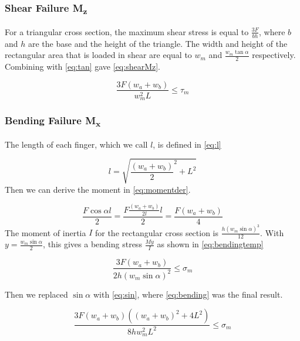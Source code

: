 \subsubsection{Shear Failure M\textsubscript{z}}
For a triangular cross section, the maximum shear stress is equal to $\frac{3F}{bh}$, where $b$ and $h$ are the base and the height of the triangle. 
The width and height of the rectangular area that is loaded in shear are equal to $w_m$ and $\frac{w_m \tan \alpha}{2} $ respectively. 
Combining with \cref{eq:tan} gave \cref{eq:shearMz}.

\begin{equation}
	\label{eq:shearMz}
	\frac{ 3 F \left(w_a + w_b \right) }{ w_m ^2 L} \le \tau_m	
\end{equation}


\subsubsection{Bending Failure M\textsubscript{x}}
The length of each finger, which we call $l$, is defined in \cref{eq:l}

\begin{equation}
	\label{eq:l}
	l = \sqrt{ \frac{\left( w_a + w_b \right)}{2} ^2 + L^2 }
\end{equation}
Then we can derive the moment in \cref{eq:momentder}.

\begin{equation}
	\label{eq:momentder}
	\frac{F \cos \alpha l}{2} =  \frac{F \frac{\left(w_a + w_b \right)}{2l} l}{2} = \frac{F \left(w_a + w_b\right)}{4}
\end{equation}
The moment of inertia $I$ for the rectangular cross section is $\frac{h \left(w_m \sin \alpha \right)^3}{12}$. 
With $y = \frac{w_m \sin \alpha }{2}$, this gives a bending stress $\frac{M y}{I}$ as shown in \cref{eq:bendingtemp}

\begin{equation}
	\label{eq:bendingtemp}
	\frac{3 F\left(w_a + w_b \right)}{2 h \left( w_m \sin \alpha \right)^2 } \le \sigma_m
\end{equation}

Then we replaced $\sin \alpha$ with \cref{eq:sin}, where \cref{eq:bending} was the final result.

\begin{equation}
	\label{eq:bending}
	\frac{ 3 F \left(w_a + w_b \right) \left(\left(w_a + w_b \right) ^2 + 4L^2 \right)  }{ 8h w_m^2 L^2 }  \le \sigma_m
\end{equation}

